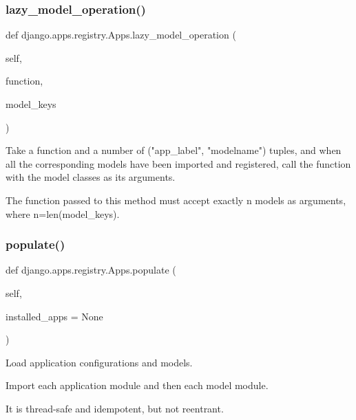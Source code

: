 \subsubsection{\texorpdfstring{lazy\+\_\+model\+\_\+operation()}{lazy\_model\_operation()}}
{\footnotesize\ttfamily def django.\+apps.\+registry.\+Apps.\+lazy\+\_\+model\+\_\+operation (\begin{DoxyParamCaption}\item[{}]{self,  }\item[{}]{function,  }\item[{}]{model\+\_\+keys }\end{DoxyParamCaption})}

\begin{DoxyVerb}Take a function and a number of ("app_label", "modelname") tuples, and
when all the corresponding models have been imported and registered,
call the function with the model classes as its arguments.

The function passed to this method must accept exactly n models as
arguments, where n=len(model_keys).
\end{DoxyVerb}
 \mbox{\label{classdjango_1_1apps_1_1registry_1_1_apps_a32d20690174973f17f6f90411fdc66f7}} 
\subsubsection{\texorpdfstring{populate()}{populate()}}
{\footnotesize\ttfamily def django.\+apps.\+registry.\+Apps.\+populate (\begin{DoxyParamCaption}\item[{}]{self,  }\item[{}]{installed\+\_\+apps = {\ttfamily None} }\end{DoxyParamCaption})}

\begin{DoxyVerb}Load application configurations and models.

Import each application module and then each model module.

It is thread-safe and idempotent, but not reentrant.
\end{DoxyVerb}
 \mbox{\label{classdjango_1_1apps_1_1registry_1_1_apps_a247cf36e424a835d2d1c211077090220}} 
